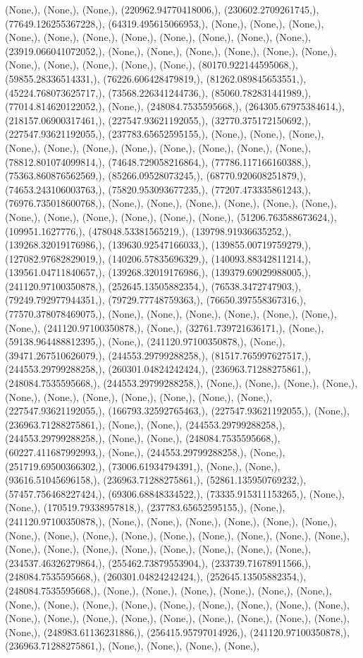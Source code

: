 \documentclass{article}
\begin{document}
(None,), (None,), (None,), (220962.94770418006,), (230602.2709261745,), (77649.126255367228,), (64319.495615066953,), (None,), (None,), (None,), (None,), (None,), (None,), (None,), (None,), (None,), (None,), (None,), (23919.066041072052,), (None,), (None,), (None,), (None,), (None,), (None,), (None,), (None,), (None,), (None,), (None,), (80170.922144595068,), (59855.28336514331,), (76226.606428479819,), (81262.089845653551,), (45224.768073625717,), (73568.226341244736,), (85060.782831441989,), (77014.814620122052,), (None,), (248084.7535595668,), (264305.67975384614,), (218157.06900317461,), (227547.93621192055,), (32770.375172150692,), (227547.93621192055,), (237783.65652595155,), (None,), (None,), (None,), (None,), (None,), (None,), (None,), (None,), (None,), (None,), (None,), (78812.801074099814,), (74648.729058216864,), (77786.117166160388,), (75363.860876562569,), (85266.09528073245,), (68770.920608251879,), (74653.243106003763,), (75820.953093677235,), (77207.473335861243,), (76976.735018600768,), (None,), (None,), (None,), (None,), (None,), (None,), (None,), (None,), (None,), (None,), (None,), (None,), (51206.763588673624,), (109951.1627776,), (478048.53381565219,), (139798.91936635252,), (139268.32019176986,), (139630.92547166033,), (139855.00719759279,), (127082.97682829019,), (140206.57835696329,), (140093.88342811214,), (139561.04711840657,), (139268.32019176986,), (139379.69029988005,), (241120.97100350878,), (252645.13505882354,), (76538.3472747903,), (79249.792977944351,), (79729.77748759363,), (76650.397558367316,), (77570.378078469075,), (None,), (None,), (None,), (None,), (None,), (None,), (None,), (241120.97100350878,), (None,), (32761.739721636171,), (None,), (59138.964488812395,), (None,), (241120.97100350878,), (None,), (39471.267510626079,), (244553.29799288258,), (81517.765997627517,), (244553.29799288258,), (260301.04824242424,), (236963.71288275861,), (248084.7535595668,), (244553.29799288258,), (None,), (None,), (None,), (None,), (None,), (None,), (None,), (None,), (None,), (None,), (None,), (227547.93621192055,), (166793.32592765463,), (227547.93621192055,), (None,), (236963.71288275861,), (None,), (None,), (244553.29799288258,), (244553.29799288258,), (None,), (None,), (248084.7535595668,), (60227.411687992993,), (None,), (244553.29799288258,), (None,), (251719.69500366302,), (73006.61934794391,), (None,), (None,), (93616.51045696158,), (236963.71288275861,), (52861.135950769232,), (57457.756468227424,), (69306.68848334522,), (73335.915311153265,), (None,), (None,), (170519.79338957818,), (237783.65652595155,), (None,), (241120.97100350878,), (None,), (None,), (None,), (None,), (None,), (None,), (None,), (None,), (None,), (None,), (None,), (None,), (None,), (None,), (None,), (None,), (None,), (None,), (None,), (None,), (None,), (None,), (None,), (234537.46326279864,), (255462.73879553904,), (233739.71678911566,), (248084.7535595668,), (260301.04824242424,), (252645.13505882354,), (248084.7535595668,), (None,), (None,), (None,), (None,), (None,), (None,), (None,), (None,), (None,), (None,), (None,), (None,), (None,), (None,), (None,), (None,), (None,), (None,), (None,), (None,), (None,), (None,), (None,), (None,), (None,), (248983.61136231886,), (256415.95797014926,), (241120.97100350878,), (236963.71288275861,), (None,), (None,), (None,), (None,), 
\end{document}
